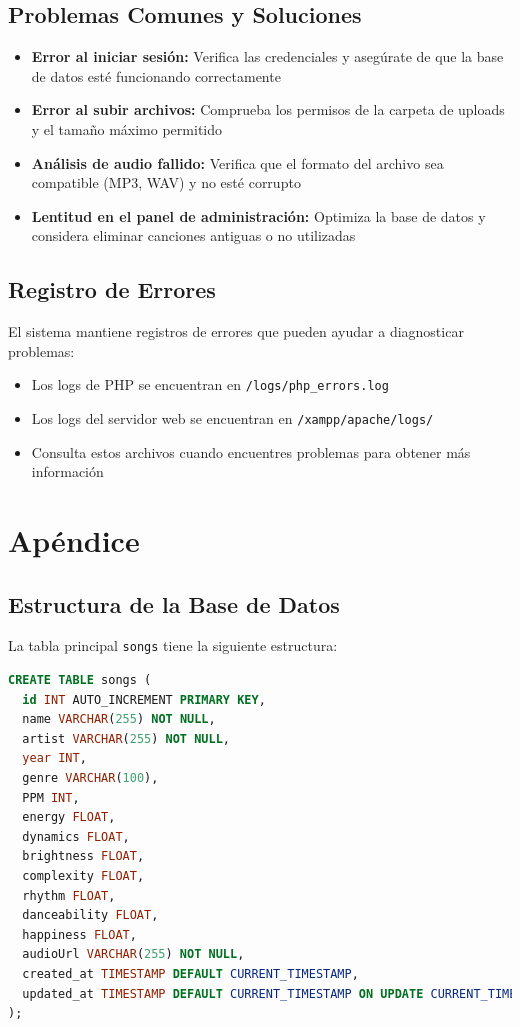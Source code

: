 \documentclass[a4paper,12pt]{article}
\begin{document}
\subsection{Problemas Comunes y Soluciones}
\begin{itemize}
  \item \textbf{Error al iniciar sesión:} Verifica las credenciales y asegúrate de que la base de datos esté funcionando correctamente
  \item \textbf{Error al subir archivos:} Comprueba los permisos de la carpeta de uploads y el tamaño máximo permitido
  \item \textbf{Análisis de audio fallido:} Verifica que el formato del archivo sea compatible (MP3, WAV) y no esté corrupto
  \item \textbf{Lentitud en el panel de administración:} Optimiza la base de datos y considera eliminar canciones antiguas o no utilizadas
\end{itemize}

\subsection{Registro de Errores}
El sistema mantiene registros de errores que pueden ayudar a diagnosticar problemas:
\begin{itemize}
  \item Los logs de PHP se encuentran en \texttt{/logs/php\_errors.log}
  \item Los logs del servidor web se encuentran en \texttt{/xampp/apache/logs/}
  \item Consulta estos archivos cuando encuentres problemas para obtener más información
\end{itemize}

\section{Apéndice}
\subsection{Estructura de la Base de Datos}
La tabla principal \texttt{songs} tiene la siguiente estructura:
\begin{lstlisting}[language=SQL]
CREATE TABLE songs (
  id INT AUTO_INCREMENT PRIMARY KEY,
  name VARCHAR(255) NOT NULL,
  artist VARCHAR(255) NOT NULL,
  year INT,
  genre VARCHAR(100),
  PPM INT,
  energy FLOAT,
  dynamics FLOAT,
  brightness FLOAT,
  complexity FLOAT,
  rhythm FLOAT,
  danceability FLOAT,
  happiness FLOAT,
  audioUrl VARCHAR(255) NOT NULL,
  created_at TIMESTAMP DEFAULT CURRENT_TIMESTAMP,
  updated_at TIMESTAMP DEFAULT CURRENT_TIMESTAMP ON UPDATE CURRENT_TIMESTAMP
);
\end{lstlisting}
\end{document}
